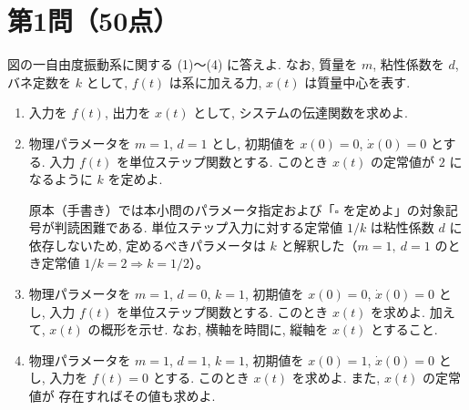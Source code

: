
\section*{第1問（50点）}

図の一自由度振動系に関する (1)〜(4) に答えよ. なお, 質量を $m$, 粘性係数を $d$,
バネ定数を $k$ として, $f(t)$ は系に加える力, $x(t)$ は質量中心を表す.

\begin{center}
\end{center}

\begin{enumerate}[label=(\arabic*)]
  \item 入力を $f(t)$, 出力を $x(t)$ として, システムの伝達関数を求めよ.

  \item 物理パラメータを $m=1$, $d=1$ とし, 初期値を $x(0)=0$, $\dot{x}(0)=0$ とする.
        入力 $f(t)$ を単位ステップ関数とする. このとき $x(t)$ の定常値が $2$ になるように
        $k$ を定めよ.

  \begin{rem}
  原本（手書き）では本小問のパラメータ指定および「$\square$ を定めよ」の対象記号が判読困難である.
  単位ステップ入力に対する定常値 $1/k$ は粘性係数 $d$ に依存しないため,
  定めるべきパラメータは $k$ と解釈した（$m=1,\ d=1$ のとき定常値 $1/k=2 \Rightarrow k=1/2$）。
  \end{rem}

  \item 物理パラメータを $m=1$, $d=0$, $k=1$, 初期値を $x(0)=0$, $\dot{x}(0)=0$ とし,
        入力 $f(t)$ を単位ステップ関数とする. このとき $x(t)$ を求めよ. 加えて,
        $x(t)$ の概形を示せ. なお, 横軸を時間に, 縦軸を $x(t)$ とすること.

  \item 物理パラメータを $m=1$, $d=1$, $k=1$, 初期値を $x(0)=1$, $\dot{x}(0)=0$ とし,
        入力を $f(t)=0$ とする. このとき $x(t)$ を求めよ. また, $x(t)$ の定常値が
        存在すればその値も求めよ.
\end{enumerate}
